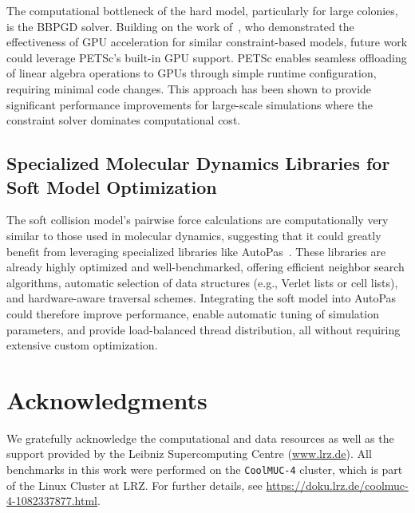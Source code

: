 \documentclass[conference]{IEEEtran}
\begin{document}
The computational bottleneck of the hard model, particularly for large colonies, is the BBPGD solver. Building on the work of~\cite{Tasora2008}, who demonstrated the effectiveness of GPU acceleration for similar constraint-based models, future work could leverage PETSc's built-in GPU support. PETSc enables seamless offloading of linear algebra operations to GPUs through simple runtime configuration, requiring minimal code changes. This approach has been shown to provide significant performance improvements for large-scale simulations where the constraint solver dominates computational cost.

\subsection{Specialized Molecular Dynamics Libraries for Soft Model Optimization}

The soft collision model's pairwise force calculations are computationally very similar to those used in molecular dynamics, suggesting that it could greatly benefit from leveraging specialized libraries like AutoPas~\cite{Gratl2019,Newcome2023}. These libraries are already highly optimized and well-benchmarked, offering efficient neighbor search algorithms, automatic selection of data structures (e.g., Verlet lists or cell lists), and hardware-aware traversal schemes. Integrating the soft model into AutoPas could therefore improve performance, enable automatic tuning of simulation parameters, and provide load-balanced thread distribution, all without requiring extensive custom optimization.

\section*{Acknowledgments}

We gratefully acknowledge the computational and data resources as well as the support provided by the Leibniz Supercomputing Centre (\url{www.lrz.de}). All benchmarks in this work were performed on the \texttt{CoolMUC-4} cluster, which is part of the Linux Cluster at LRZ. For further details, see \url{https://doku.lrz.de/coolmuc-4-1082337877.html}.


\newpage

\balance


\newpage
\nobalance


\onecolumn

\appendix
\renewcommand{\thefigure}{A\arabic{figure}}
\renewcommand{\thetable}{A.\arabic{table}}
\setcounter{figure}{0}
\setcounter{table}{0}
\end{document}
